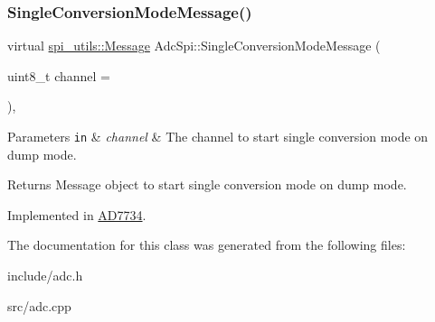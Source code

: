 \subsubsection{\texorpdfstring{Single\+Conversion\+Mode\+Message()}{SingleConversionModeMessage()}}
{\footnotesize\ttfamily virtual \mbox{\hyperlink{structspi__utils_1_1Message}{spi\+\_\+utils\+::\+Message}} Adc\+Spi\+::\+Single\+Conversion\+Mode\+Message (\begin{DoxyParamCaption}\item[{uint8\+\_\+t}]{channel = {} }\end{DoxyParamCaption})\hspace{0.3cm}{\ttfamily [protected]}, {}}


\begin{DoxyParams}[1]{Parameters}
\mbox{\tt in}  & {\em channel} & The channel to start single conversion mode on dump mode. \\
\hline
\end{DoxyParams}
\begin{DoxyReturn}{Returns}
Message object to start single conversion mode on dump mode. 
\end{DoxyReturn}


Implemented in \mbox{\hyperlink{classAD7734_af677fbfbae0ec1c78b453ceb4a6736ec}{A\+D7734}}.



The documentation for this class was generated from the following files\+:\begin{DoxyCompactItemize}
\item 
include/adc.\+h\item 
src/adc.\+cpp\end{DoxyCompactItemize}
